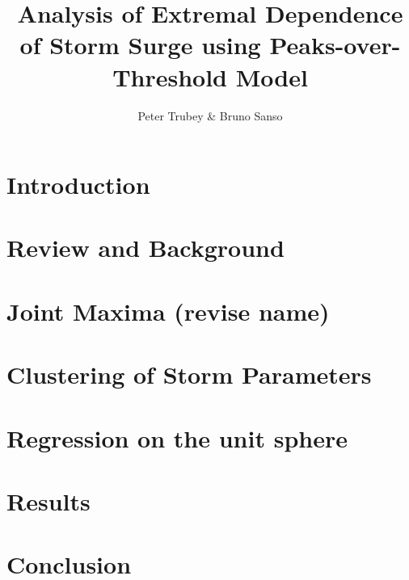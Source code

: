 \documentclass{article}
\title{Analysis of Extremal Dependence of Storm Surge using Peaks-over-Threshold Model}
\author{Peter Trubey \& Bruno Sanso}
\date{}
\begin{document}
\maketitle

\begin{abstract}
    
\end{abstract}

\section{Introduction\label{ref:introduction}}


\section{Review and Background\label{ref:review}}


\section{Joint Maxima (revise name)\label{sec:jointmaxima}}


\section{Clustering of Storm Parameters\label{sec:clustering}}


\section{Regression on the unit sphere\label{sec:regression}}


\section{Results\label{ref:results}}


\section{Conclusion\label{ref:conclusion}}


\appendix




\end{document}
